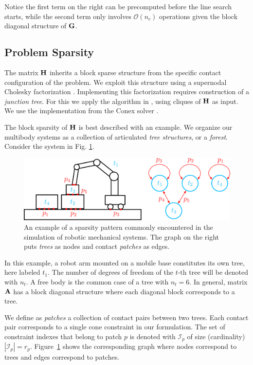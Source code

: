 Notice the first term on the right can be precomputed before the line search
 starts, while the second term only involves $\mathcal{O}(n_c)$ operations given
 the block diagonal structure of ${\mathbf{G}}$.

\subsection{Problem Sparsity}
\label{sec:problem_sparsity}

The matrix ${\mathbf{H}}$ inherits a block sparse structure from
the specific contact configuration of the problem. 
We exploit this structure using a supernodal Cholesky factorization \cite[\S
9]{bib:davis2016survey}. Implementing this factorization requires construction
of a \emph{junction tree}.  For this we apply the algorithm in
\cite{bib:smail2017junction}, using cliques of ${\mathbf{H}}$ as input. We
use the implementation from the Conex solver \cite{bib:permenter2020}.

The block sparsity of ${\mathbf{H}}$  is best described with an example. We organize
our multibody systems as a collection of articulated \emph{tree structures}, or
a \emph{forest}. Consider the system in Fig. \ref{fig:sparsity_example}.
\begin{figure}[!h]
	\centering
	\includegraphics[width=0.9\columnwidth]{figures/schematics/sparsity_example.png}
	\caption{\label{fig:sparsity_example} 
	An example of a sparsity pattern commonly encountered in the
	simulation of robotic mechanical systems. The graph on the right puts
	\textit{trees} as nodes and contact \textit{patches} as edges.}
\end{figure}
In this example, a robot arm mounted on a mobile base constitutes its own tree,
here labeled $t_1$. The number of degrees of freedom of the $t\text{-th}$ tree
will be denoted with $n_t$. A free body is the common case of a tree with
$n_t=6$. In general, matrix ${\mathbf{A}}$ has a
block diagonal structure where each diagonal block corresponds to a tree.

We define as \textit{patches} a collection of contact pairs between two
trees. Each contact pair corresponds to a single cone constraint in our
formulation. The set of constraint indexes that belong to patch $p$ is
denoted with $\mathcal{I}_p$ of size (cardinality) $|\mathcal{I}_p| = r_p$.
Figure~\ref{fig:sparsity_example} shows the corresponding graph where nodes
correspond to trees and edges correspond to patches.

